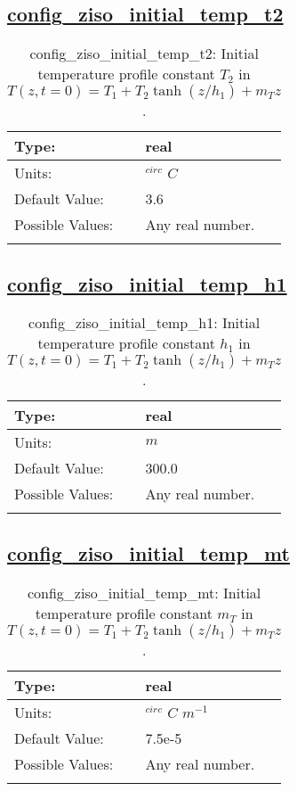 \subsection[config\_ziso\_initial\_temp\_t2]{\hyperref[sec:nm_tab_ziso]{config\_ziso\_initial\_temp\_t2}}
\label{subsec:nm_sec_config_ziso_initial_temp_t2}
\begin{center}
\begin{longtable}{| p{2.0in} || p{4.0in} |}
    \hline
    Type: & real \\
    \hline
    Units: & $^{circ}$ $C$ \\
    \hline
    Default Value: & 3.6 \\
    \hline
    Possible Values: & Any real number. \\
    \hline
    \caption{config\_ziso\_initial\_temp\_t2:  Initial temperature profile constant  $T_2$  in  $T(z,t=0) = T_1 + T_2 \tanh(z/h_1) + m_T z$ .}
\end{longtable}
\end{center}
\subsection[config\_ziso\_initial\_temp\_h1]{\hyperref[sec:nm_tab_ziso]{config\_ziso\_initial\_temp\_h1}}
\label{subsec:nm_sec_config_ziso_initial_temp_h1}
\begin{center}
\begin{longtable}{| p{2.0in} || p{4.0in} |}
    \hline
    Type: & real \\
    \hline
    Units: & $m$ \\
    \hline
    Default Value: & 300.0 \\
    \hline
    Possible Values: & Any real number. \\
    \hline
    \caption{config\_ziso\_initial\_temp\_h1:  Initial temperature profile constant  $h_1$  in  $T(z,t=0) = T_1 + T_2 \tanh(z/h_1) + m_T z$ .}
\end{longtable}
\end{center}
\subsection[config\_ziso\_initial\_temp\_mt]{\hyperref[sec:nm_tab_ziso]{config\_ziso\_initial\_temp\_mt}}
\label{subsec:nm_sec_config_ziso_initial_temp_mt}
\begin{center}
\begin{longtable}{| p{2.0in} || p{4.0in} |}
    \hline
    Type: & real \\
    \hline
    Units: & $^{circ}$ $C$ $m^{-1}$ \\
    \hline
    Default Value: & 7.5e-5 \\
    \hline
    Possible Values: & Any real number. \\
    \hline
    \caption{config\_ziso\_initial\_temp\_mt:  Initial temperature profile constant  $m_T$  in  $T(z,t=0) = T_1 + T_2 \tanh(z/h_1) + m_T z$ .}
\end{longtable}
\end{center}
